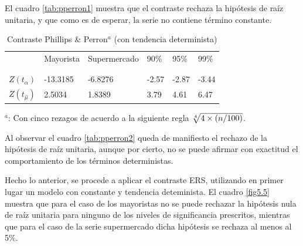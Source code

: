 \documentclass[12pt, twoside]{book}\usepackage[]{graphicx}\usepackage[]{color}
\numberwithin{equation}{section}
\numberwithin{theorem}{section}
\numberwithin{teorema}{section}
\numberwithin{defi}{section}
\numberwithin{prop}{section}
\numberwithin{defi}{section}
\theoremstyle{plain}
\begin{document}
El cuadro \ref{tab:pperron1} muestra que el contraste rechaza la hipótesis de raíz unitaria, y que como es de esperar, la serie no contiene término constante. 





\begin{table}[h]
\centering
\begin{threeparttable}
\caption{Contraste Phillips \& Perron$^{a}$ (con tendencia determinista) \label{tab:pperron2}}
\begin{tabular}{@{}llllll@{}}
\toprule
\multicolumn{1}{c}{} &
\multicolumn{1}{l}{Mayorista} & 
\multicolumn{1}{l}{Supermercado} & 
90\% & 95\% & 99\% \\ 
\\
\cmidrule(l){2-2} \cmidrule(l){3-3} \cmidrule(l){4-6} \\
$Z(t_{\hat{\alpha}})$ & -13.3185 & -6.8276 &  -2.57 & -2.87 & -3.44 \\
$Z(t_{\hat{\mu}})$ & 2.5034 & 1.8389 & 3.79 & 4.61 & 6.47 \\
\bottomrule
\end{tabular}
\label{tab-5}
\begin{tablenotes}
\small 
\item $^{a}$: Con cinco rezagos de acuerdo a la siguiente regla $\root 4 \of {4 \times (n/100)}$. 
\end{tablenotes}
\end{threeparttable}
\end{table}

Al observar el cuadro \ref{tab:pperron2} queda de manifiesto el rechazo de la hipótesis de raíz unitaria, aunque por cierto, no se puede afirmar con exactitud el comportamiento de los términos deterministas. 



Hecho lo anterior, se procede a aplicar el contraste ERS, utilizando en primer lugar un modelo con constante y tendencia deteminista. El cuadro \ref{fig5.5} muestra que para el caso de los mayoristas no se puede rechazar la hipótesis nula de raíz unitaria para ninguno de los niveles de significancia prescritos, mientras que para el caso de la serie supermercado dicha hipótesis se rechaza al menos al 5\%.  
\end{document}
